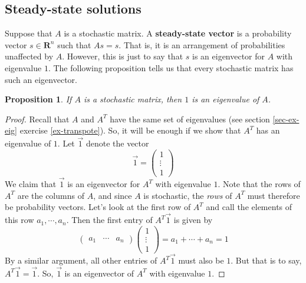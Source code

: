 \documentclass[12pt]{article}
\numberwithin{equation}{subsection}
\numberwithin{figure}{subsection}
\newtheorem{prop}[subsection]{Proposition}
\theoremstyle{note}
\newcommand{\R}{\mathbf{R}}
\begin{document}
\subsection{Steady-state solutions}

Suppose that $A$ is a stochastic matrix. A \textbf{steady-state vector} is a probability vector $s\in \R^n$ such that $As=s$. That is, it is an arrangement of probabilities unaffected by $A$. However, this is just to say that $s$ is an eigenvector for $A$ with eigenvalue $1$. The following proposition tells us that every stochastic matrix has such an eigenvector.


\begin{prop} \label{prop-1-eig}
	If $A$ is a stochastic matrix, then $1$ is an eigenvalue of $A$. 
\end{prop}

\begin{proof}
	Recall that $A$ and $A^T$ have the same set of eigenvalues (see section \ref{sec-ex-eig} exercise \ref{ex-transpote}). So, it will be enough if we show that $A^T$ has an eigenvalue of $1$. Let $\vec{1}$ denote the vector \[\vec{1}=\begin{pmatrix} 1 \\ \vdots \\ 1\end{pmatrix}\] We claim that $\vec{1}$ is an eigenvector for $A^T$ with eigenvalue $1$. Note that the rows of $A^T$ are the columns of $A$, and since $A$ is stochastic, the \textit{rows} of $A^T$ must therefore be probability vectors.  Let's look at the first row of $A^T$ and call the elements of this row $a_1, \cdots, a_n$. Then the first entry of $A^T \vec{1}$ is given by \[ \begin{pmatrix} a_1 & \cdots & a_n\end{pmatrix} \begin{pmatrix} 1 \\ \vdots \\ 1\end{pmatrix}=a_1+\cdots +a_n=1\] By a similar argument, all other entries of $A^T\vec{1}$ must also be $1$. But that is to say, $A^T \vec{1}=\vec{1}$. So, $\vec{1}$ is an eigenvector of $A^T$ with eigenvalue $1$.
\end{proof}
\end{document}
